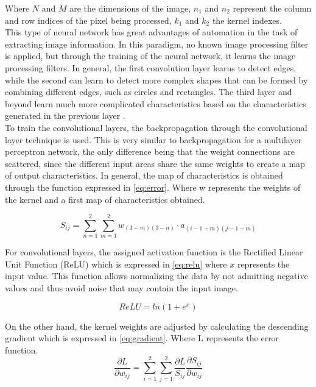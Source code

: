 \documentclass[conference]{IEEEtran}
\begin{document}
Where $N$ and $M$ are the dimensions of the image, $n_1$ and $n_2$ represent the column and row indices of the pixel being processed, $k_1$ and $k_2$ the kernel indexes.\\

This type of neural network has great advantages of automation in the task of extracting image information. In this paradigm, no known image processing filter is applied, but through the training of the neural network, it learns the image processing filters. In general, the first convolution layer learns to detect edges, while the second can learn to detect more complex shapes that can be formed by combining different edges, such as circles and rectangles. The third layer and beyond learn much more complicated characteristics based on the characteristics generated in the previous layer \cite{pattanayak2017pro}.\\


To train the convolutional layers, the backpropagation through the convolutional layer technique is used. This is very similar to backpropagation for a multilayer perceptron network, the only difference being that the weight connections are scattered, since the different input areas share the same weights to create a map of output characteristics. In general, the map of characteristics is obtained through the function expressed in \eqref{eq:error}. Where w represents the weights of the kernel and a first map of characteristics obtained.

\begin{equation}
S_{ij} = \sum_{n=1}^{2} \sum_{m=1}^{2} w_{(3-m)(3-n)} \cdot a_{(i-1+m)(j-1+m)}
\label{eq:error}
\end{equation}

For convolutional layers, the assigned activation function is the Rectified Linear Unit Function (ReLU) which is expressed in \eqref{eq:relu} where $x$ represents the input value. This function allows normalizing the data by not admitting negative values and thus avoid noise that may contain the input image.

\begin{equation}
ReLU = ln(1+e^x)
\label{eq:relu}
\end{equation}

On the other hand, the kernel weights are adjusted by calculating the descending gradient which is expressed in \eqref{eq:gradient}. Where L represents the error function.
\begin{equation}
\frac{\partial L}{\partial w_{ij}} = \sum_{i=1}^{2} \sum_{j=1}^{2} \frac{\partial L}{S_{ij}} \frac{\partial S_{ij}}{\partial w_{ij}}
\label{eq:gradient}
\end{equation}
\end{document}
